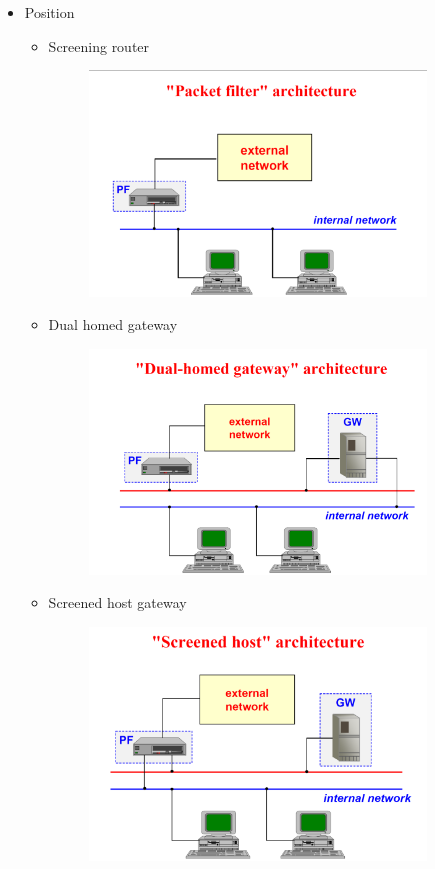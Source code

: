 \documentclass{article}
\begin{document}
\begin{itemize}
\item Position
\begin{itemize}
  \item Screening router
  \begin{figure}[H]
    \centering
    \includegraphics[width=0.90\textwidth]{figure/packet_filter.png}
  \end{figure}
  \item Dual homed gateway
  \begin{figure}[H]
    \centering
    \includegraphics[width=0.90\textwidth]{figure/Dual-home_gateway.png}
  \end{figure}
  \item Screened host gateway
  \begin{figure}[H]
    \centering
    \includegraphics[width=0.90\textwidth]{figure/screened_host.png}

\end{figure}
\end{itemize}
\end{itemize}
\end{document}
